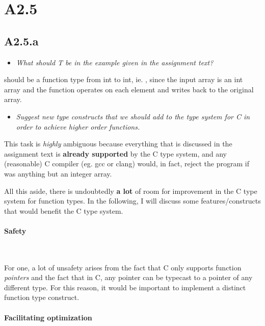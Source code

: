 \newpage

\section{A2.5}

\subsection{A2.5.a}

\begin{itemize}
  \item \emph{What should T be in the example given in the assignment text?}
\end{itemize}

 should be a function type from int to int, ie. , since the
input array is an int array and the function operates on each element and writes
back to the original array.

\begin{itemize}
  \item \emph{Suggest new type constructs that we should add to the type system
    for C in order to achieve higher order functions.}
\end{itemize}

This task is \emph{highly} ambiguous because everything that is discussed in the
assignment text is \textbf{already supported} by the C type system, and any
(reasonable) C compiler (eg. gcc or clang) would, in fact, reject the program if
 was anything but an integer array.

\medskip

All this aside, there is undoubtedly \textbf{a lot} of room for improvement in
the C type system for function types. In the following, I will discuss some
features/constructs that would benefit the C type system.

\paragraph{Safety}~\smallskip

For one, a lot of unsafety arises from the fact that C only supports function
\textit{pointers} and the fact that in C, any pointer can be typecast to a
pointer of any different type. For this reason, it would be important to
implement a distinct function type construct.


\paragraph{Facilitating optimization}~\smallskip

